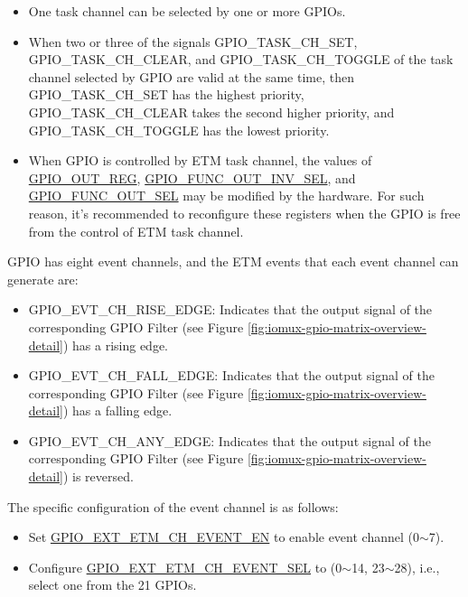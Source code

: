 \documentclass[main\_\_EN.tex]{subfiles}
\begin{document}
\begin{tiplisting}
\vspace{-2em}
\begin{itemize}
\item One task channel can be selected by one or more GPIOs.

\item When two or three of the signals GPIO\_TASK\_CH\_SET, GPIO\_TASK\_CH\_CLEAR, and GPIO\_TASK\_CH\_TOGGLE of the task channel  selected by GPIO are valid at the same time, then GPIO\_TASK\_CH\_SET has the highest priority, GPIO\_TASK\_CH\_CLEAR takes the second higher priority, and GPIO\_TASK\_CH\_TOGGLE has the lowest priority.

\item When GPIO is controlled by ETM task channel, the values of \hyperref[regdesc:GPIOOUTREG]{GPIO\_OUT\_REG}, \hyperref[fielddesc:GPIOFUNCNOUTINVSEL]{GPIO\_FUNC\_OUT\_INV\_SEL}, and \hyperref[fielddesc:GPIOFUNCNOUTSEL]{GPIO\_FUNC\_OUT\_SEL} may be modified by the hardware. For such reason, it's recommended to reconfigure these registers when the GPIO is free from the control of ETM task channel.
\end{itemize}
\end{tiplisting}

GPIO has eight event channels, and the ETM events that each event channel can generate are:

\begin{itemize}
    \item GPIO\_EVT\_CH\_RISE\_EDGE: Indicates that the output signal of the corresponding GPIO Filter (see Figure \ref{fig:iomux-gpio-matrix-overview-detail}) has a rising edge.
    \item GPIO\_EVT\_CH\_FALL\_EDGE: Indicates that the output signal of the corresponding GPIO Filter (see Figure \ref{fig:iomux-gpio-matrix-overview-detail}) has a falling edge.
    \item GPIO\_EVT\_CH\_ANY\_EDGE: Indicates that the output signal of the corresponding GPIO Filter (see Figure \ref{fig:iomux-gpio-matrix-overview-detail}) is reversed.
\end{itemize}

The specific configuration of the event channel is as follows:

\begin{itemize}
    \item Set  \hyperref[fielddesc:GPIOEXTETMCH0EVENTEN]{GPIO\_EXT\_ETM\_CH\_EVENT\_EN} to enable event channel  (0$\sim$7).
    \item Configure \hyperref[fielddesc:GPIOEXTETMCH0EVENTSEL]{GPIO\_EXT\_ETM\_CH\_EVENT\_SEL} to  (0$\sim$14, 23$\sim$28), i.e., select one from the 21 GPIOs.
\end{itemize}
\end{document}
